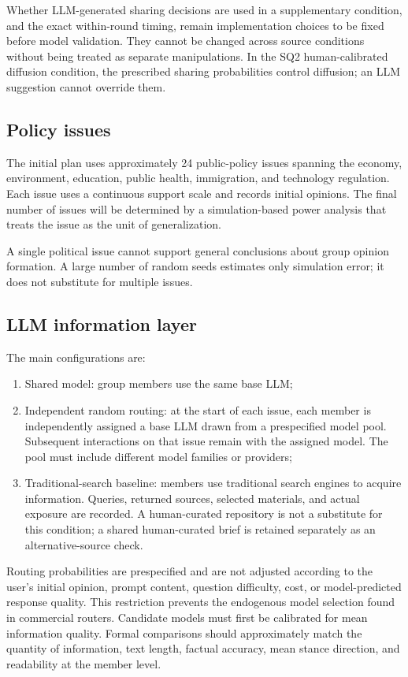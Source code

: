 \documentclass[11pt,a4paper]{article}
\begin{document}
Whether LLM-generated sharing decisions are used in a supplementary condition, and the exact within-round timing, remain implementation choices to be fixed before model validation. They cannot be changed across source conditions without being treated as separate manipulations. In the SQ2 human-calibrated diffusion condition, the prescribed sharing probabilities control diffusion; an LLM suggestion cannot override them.

\subsection{Policy issues}

The initial plan uses approximately 24 public-policy issues spanning the economy, environment, education, public health, immigration, and technology regulation. Each issue uses a continuous support scale and records initial opinions. The final number of issues will be determined by a simulation-based power analysis that treats the issue as the unit of generalization.

A single political issue cannot support general conclusions about group opinion formation. A large number of random seeds estimates only simulation error; it does not substitute for multiple issues.

\subsection{LLM information layer}

The main configurations are:

\begin{enumerate}
\item Shared model: group members use the same base LLM;
\item Independent random routing: at the start of each issue, each member is independently assigned a base LLM drawn from a prespecified model pool. Subsequent interactions on that issue remain with the assigned model. The pool must include different model families or providers;
\item Traditional-search baseline: members use traditional search engines to acquire information. Queries, returned sources, selected materials, and actual exposure are recorded. A human-curated repository is not a substitute for this condition; a shared human-curated brief is retained separately as an alternative-source check.
\end{enumerate}

Routing probabilities are prespecified and are not adjusted according to the user's initial opinion, prompt content, question difficulty, cost, or model-predicted response quality. This restriction prevents the endogenous model selection found in commercial routers. Candidate models must first be calibrated for mean information quality. Formal comparisons should approximately match the quantity of information, text length, factual accuracy, mean stance direction, and readability at the member level.
\end{document}
